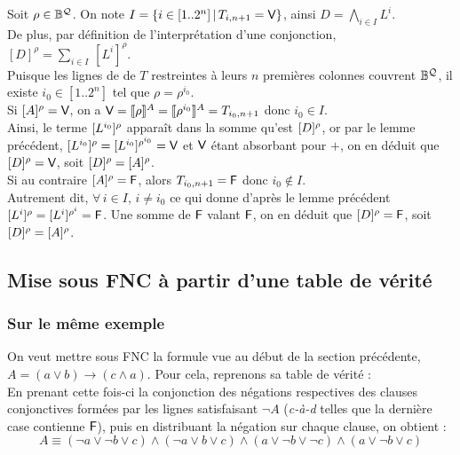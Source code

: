 			\begin{Preuve}
				Soit \(\rho \in \mathbb{B}^{\mathcal{Q}}\). On note \(I = \{i \in [1..2^n] \, | \, T_{i,n+1} = \text{\sf{V}}\}\), ainsi \(\displaystyle D = \bigwedge_{i \in I} L^i\). \\
				De plus, par définition de l'interprétation d'une conjonction, \(\displaystyle [D]^\rho = \sum_{i \in I} \, [L^i]^\rho\). \\
				Puisque les lignes de de \(T\) restreintes à leurs \(n\) premières colonnes couvrent \(\mathbb{B}^{\mathcal{Q}}\), il existe \(i_0 \in [1..2^n]\) tel que \(\rho = \rho^{i_0}\). \\[2mm]
				\bdot Si \([A]^\rho = \text{\sf{V}}\), on a \(\text{\sf{V}} = \llbracket \rho \rrbracket^{A} = \llbracket \rho^{i_0} \rrbracket^{A} = T_{i_0,n+1}\) donc \(i_0 \in I\). \\
				Ainsi, le terme \([L^{i_0}]^{\rho}\) apparaît dans la somme qu'est \([D]^{\rho}\), or par le lemme précédent, \([L^{i_0}]^{\rho} = [L^{i_0}]^{\rho^{i_0}} = \text{\sf{V}}\) et \(\text{\sf{V}}\) étant absorbant pour \(+\), on en déduit que \([D]^{\rho} = \text{\sf{V}}\), soit \([D]^{\rho} = [A]^{\rho}\). \\[1mm]
				\bdot Si au contraire \([A]^{\rho} = \text{\sf{F}}\), alors \(T_{i_0,n+1} = \text{\sf{F}}\) donc \(i_0 \notin I\). \\
				Autrement dit, \(\forall \, i \in I, \, i \neq i_0\) ce qui donne d'après le lemme précédent \([L^i]^{\rho} = [L^i]^{\rho^i} = \text{\sf{F}}\). Une somme de \(\text{\sf{F}}\) valant \(\text{\sf{F}}\), on en déduit que \([D]^{\rho} = \text{\sf{F}}\), soit \([D]^{\rho} = [A]^{\rho}\).
			\end{Preuve}
				
	\subsection{Mise sous FNC à partir d'une table de vérité}
	
		\subsubsection{Sur le même exemple}
			
			\eqskip{2mm}
			On veut mettre sous FNC la formule vue au début de la section précédente, \(A = (a \vee b) \rightarrow (c \wedge a)\). Pour cela, reprenons sa table de vérité : \\[60mm]
			En prenant cette fois-ci la conjonction des négations respectives des clauses conjonctives formées par les lignes satisfaisant \(\neg A\) (\emph{c-à-d} telles que la dernière case contienne \(\text{\sf{F}}\)), puis en distribuant la négation sur chaque clause, on obtient :
				\[
					A \equiv (\neg a \vee \neg b \vee c) \wedge (\neg a \vee b \vee c) \wedge (a \vee \neg b \vee \neg c) \wedge (a \vee \neg b \vee c)
				\]
				
